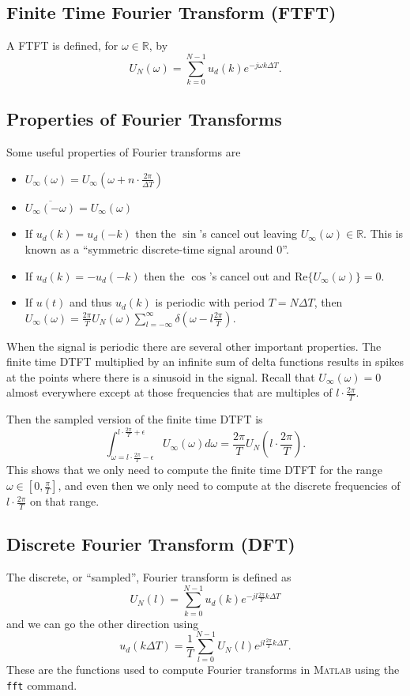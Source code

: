 \documentclass[lecture,12pt,]{pcms-l}
\theoremstyle{example}
\newcommand{\w}{\omega}
\begin{document}
\subsection{Finite Time Fourier Transform (FTFT)}
A FTFT is defined, for $\w\in\mathbb{R}$, by
$$U_N(\w) = \sum_{k=0}^{N-1} u_d(k) e^{-j\w k\Delta T}.$$

\subsection{Properties of Fourier Transforms}
Some useful properties of Fourier transforms are
\begin{itemize}
\item $U_\infty(\w) = U_\infty(\w + n\cdot \frac{2\pi}{\Delta T})$
\item $\overline{U_\infty(-\w)} = U_\infty(\w)$
\item If $u_d(k) = u_d(-k)$ then the $\sin$'s cancel out leaving $U_\infty(\w)\in\mathbb{R}$. This is known as a ``symmetric discrete-time signal around $0$''.
\item If $u_d(k) = -u_d(-k)$ then the $\cos$'s cancel out and $\text{Re}\lbrace U_\infty(\w)\rbrace = 0$.
\item If $u(t)$ and thus $u_d(k)$ is periodic with period $T=N\Delta T$, then $U_\infty(\w) = \frac{2\pi}{T}U_N(\w) \sum_{l=-\infty}^\infty \delta(\w-l\frac{2\pi}{T})$.
\end{itemize}
When the signal is periodic there are several other important properties. The finite time DTFT multiplied by an infinite sum of delta functions results in spikes at the points where there is a sinusoid in the signal. Recall that $U_\infty(\w)=0$ almost everywhere except at those frequencies that are multiples of $l\cdot \frac{2\pi}{T}$.

Then the sampled version of the finite time DTFT is
$$\int_{\w=l\cdot \frac{2\pi}{T}-\epsilon}^{l\cdot \frac{2\pi}{T}+\epsilon} U_\infty(\w)d\w
= \frac{2\pi}{T}U_N(l\cdot \frac{2\pi}{T}).$$
This shows that we only need to compute the finite time DTFT for the range $\w\in[0,\frac{\pi}{T}]$, and even then we only need to compute at the discrete frequencies of $l\cdot\frac{2\pi}{T}$ on that range.

\subsection{Discrete Fourier Transform (DFT)}
The discrete, or ``sampled'', Fourier transform is defined as
$$U_N(l) = \sum_{k=0}^{N-1} u_d(k) e^{-jl\frac{2\pi}{T}k\Delta T}$$
and we can go the other direction using
$$u_d(k\Delta T) = \frac{1}{T} \sum_{l=0}^{N-1} U_N(l) e^{jl\frac{2\pi}{T}k\Delta T}.$$
These are the functions used to compute Fourier transforms in \textsc{Matlab} using the \texttt{fft} command.
\end{document}

